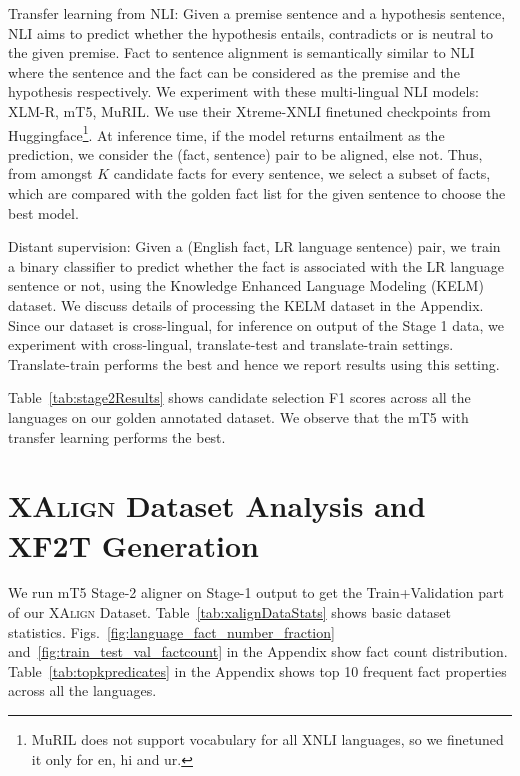 \documentclass[11pt]{article}
\begin{document}
\noindent Transfer learning from NLI: Given a premise sentence and a hypothesis sentence, NLI aims to predict whether the hypothesis entails, contradicts or is neutral to the given premise. Fact to sentence alignment is semantically similar to NLI where the sentence and the fact can be considered as the premise and the hypothesis respectively. We experiment with these multi-lingual NLI models: XLM-R, mT5, MuRIL. We use their Xtreme-XNLI finetuned checkpoints from Huggingface\footnote{MuRIL does not support vocabulary for all XNLI languages, so we finetuned it only for en, hi and ur.}. At inference time, if the model returns entailment as the prediction, we consider the (fact, sentence) pair to be aligned, else not. Thus, from amongst $K$ candidate facts for every sentence, we select a subset of facts, which are compared with the golden fact list for the given sentence to choose the best model.

\noindent Distant supervision: Given a (English fact, LR language sentence) pair, we train a binary classifier to predict whether the fact is associated with the LR language sentence or not, using the Knowledge Enhanced Language Modeling (KELM)~\cite{agarwal2021knowledge} dataset. We discuss details of processing the KELM dataset in the Appendix. Since our dataset is cross-lingual, for inference on output of the Stage 1 data, we experiment with cross-lingual, translate-test and translate-train settings. Translate-train  performs the best and hence we report results using this setting.

Table~\ref{tab:stage2Results} shows candidate selection F1 scores across all the languages  on our golden annotated dataset. We observe that the mT5 with transfer learning performs the best. 

\section{\textsc{XAlign} Dataset Analysis and XF2T Generation}
\label{sec:approach}
We run mT5 Stage-2 aligner on Stage-1 output to get the Train+Validation part of our \textsc{XAlign} Dataset.  Table~\ref{tab:xalignDataStats} shows basic dataset statistics. Figs.~\ref{fig:language_fact_number_fraction} and~\ref{fig:train_test_val_factcount} in the Appendix show fact count distribution.  Table~\ref{tab:topkpredicates} in the Appendix shows top 10 frequent fact properties across all the languages.
\end{document}

